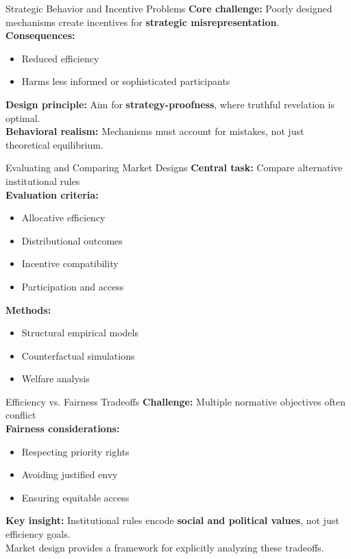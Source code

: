\documentclass{beamer}
\begin{document}
\begin{frame}{Strategic Behavior and Incentive Problems}
\textbf{Core challenge:} Poorly designed mechanisms create incentives for \textbf{strategic misrepresentation}.
\vspace{0.5cm}
\\
\textbf{Consequences:}
\begin{itemize}
  \item Reduced efficiency
  \item Harms less informed or sophisticated participants
\end{itemize}
\vspace{0.5cm}
\textbf{Design principle:} Aim for \textbf{strategy-proofness}, where truthful revelation is optimal.
\vspace{0.5cm}
\\
\textbf{Behavioral realism:} Mechanisms must account for mistakes, not just theoretical equilibrium.
\end{frame}

\begin{frame}{Evaluating and Comparing Market Designs}
\textbf{Central task:} Compare alternative institutional rules
\vspace{0.5cm}
\\
\textbf{Evaluation criteria:}
\begin{itemize}
  \item Allocative efficiency
  \item Distributional outcomes
  \item Incentive compatibility
  \item Participation and access
\end{itemize}
\vspace{0.5cm}
\textbf{Methods:}
\begin{itemize}
  \item Structural empirical models
  \item Counterfactual simulations
  \item Welfare analysis
\end{itemize}
\end{frame}

\begin{frame}{Efficiency vs. Fairness Tradeoffs}
\textbf{Challenge:} Multiple normative objectives often conflict
\vspace{0.5cm}
\\
\textbf{Fairness considerations:}
\begin{itemize}
  \item Respecting priority rights
  \item Avoiding justified envy
  \item Ensuring equitable access
\end{itemize}
\vspace{0.5cm}
\textbf{Key insight:} Institutional rules encode \textbf{social and political values}, not just efficiency goals.
\vspace{0.5cm}
\\
Market design provides a framework for explicitly analyzing these tradeoffs.
\end{frame}
\end{document}
